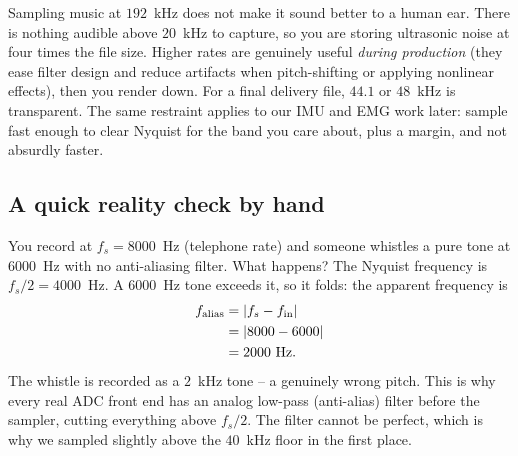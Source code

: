 \begin{trapbox}
Sampling music at $192$~kHz does not make it sound better to a human
ear. There is nothing audible above $20$~kHz to capture, so you are storing ultrasonic noise at
four times the file size. Higher rates are genuinely useful \emph{during production} (they ease filter
design and reduce artifacts when pitch-shifting or applying nonlinear effects), then you render
down. For a final delivery file, $44.1$ or $48$~kHz is transparent. The same restraint applies to
our IMU and EMG work later: sample fast enough to clear Nyquist for the band you care about, plus
a margin, and not absurdly faster.
\end{trapbox}

\subsection*{A quick reality check by hand}

\begin{example}
\label{ch26:ex-alias}
You record at $f_s = 8000$~Hz (telephone rate) and someone whistles a pure tone at $6000$~Hz with
no anti-aliasing filter. What happens? The Nyquist frequency is $f_s/2 = 4000$~Hz. A $6000$~Hz
tone exceeds it, so it folds: the apparent frequency is
\begin{align*}
  f_{\text{alias}} &= \lvert f_s - f_{\text{in}}\rvert \\
                   &= \lvert8000 - 6000\rvert \\
                   &= 2000~\text{Hz}.
\end{align*}
The whistle is recorded as a $2$~kHz tone -- a genuinely wrong pitch. This is why every real ADC
front end has an analog low-pass (anti-alias) filter before the sampler, cutting everything above
$f_s/2$. The filter cannot be perfect, which is why we sampled slightly above the
$40$~kHz floor in the first place.
\end{example}

